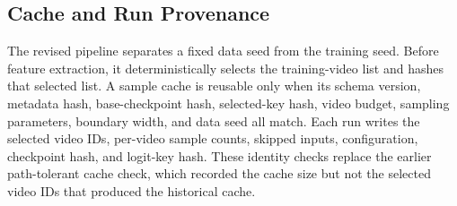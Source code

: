 \subsection{Cache and Run Provenance}

The revised pipeline separates a fixed data seed from the training seed.
Before feature extraction, it deterministically selects the training-video
list and hashes that selected list. A sample cache is reusable only when its schema
version, metadata hash, base-checkpoint hash, selected-key hash, video budget,
sampling parameters, boundary width, and data seed all match. Each run writes
the selected video IDs, per-video sample counts, skipped inputs, configuration,
checkpoint hash, and logit-key hash. These identity checks replace the earlier
path-tolerant cache check, which recorded the cache size but not the selected
video IDs that produced the historical cache.
